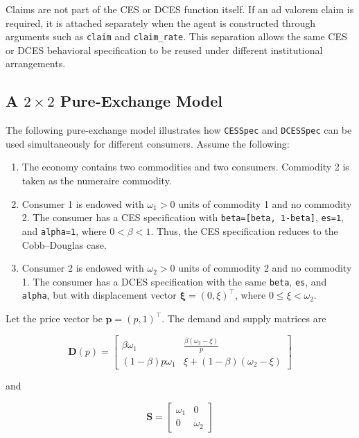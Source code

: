 \documentclass[
  letterpaper,
  DIV=11,
  numbers=noendperiod]{scrreprt}
\begin{document}
Claims are not part of the CES or DCES function itself. If an ad valorem
claim is required, it is attached separately when the agent is
constructed through arguments such as \texttt{claim} and
\texttt{claim\_rate}. This separation allows the same CES or DCES
behavioral specification to be reused under different institutional
arrangements.

\subsection{\texorpdfstring{A \(2\times2\) Pure-Exchange
Model}{A 2\textbackslash times2 Pure-Exchange Model}}\label{a-2times2-pure-exchange-model}

The following pure-exchange model illustrates how \texttt{CESSpec} and
\texttt{DCESSpec} can be used simultaneously for different consumers.
Assume the following:

\begin{enumerate}
\def\labelenumi{\arabic{enumi}.}
\item
  The economy contains two commodities and two consumers. Commodity 2 is
  taken as the numeraire commodity.
\item
  Consumer 1 is endowed with \(\omega_1>0\) units of commodity 1 and no
  commodity 2. The consumer has a CES specification with
  \texttt{beta={[}beta,\ 1-beta{]}}, \texttt{es=1}, and
  \texttt{alpha=1}, where \(0<\beta<1\). Thus, the CES specification
  reduces to the Cobb--Douglas case.
\item
  Consumer 2 is endowed with \(\omega_2>0\) units of commodity 2 and no
  commodity 1. The consumer has a DCES specification with the same
  \texttt{beta}, \texttt{es}, and \texttt{alpha}, but with displacement
  vector \(\boldsymbol{\xi}=(0,\xi)^\top\), where \(0\leq\xi<\omega_2\).
\end{enumerate}

Let the price vector be \(\mathbf p=(p,1)^\top\). The demand and supply
matrices are

\[
\mathbf D(p)
=
\begin{bmatrix}
\beta\omega_1 &
\frac{\beta(\omega_2-\xi)}{p}
\\
(1-\beta)p\omega_1 &
\xi+(1-\beta)(\omega_2-\xi)
\end{bmatrix}
\]

and

\[
\mathbf S
=
\begin{bmatrix}
\omega_1&0\\
0&\omega_2
\end{bmatrix}
\]
\end{document}
